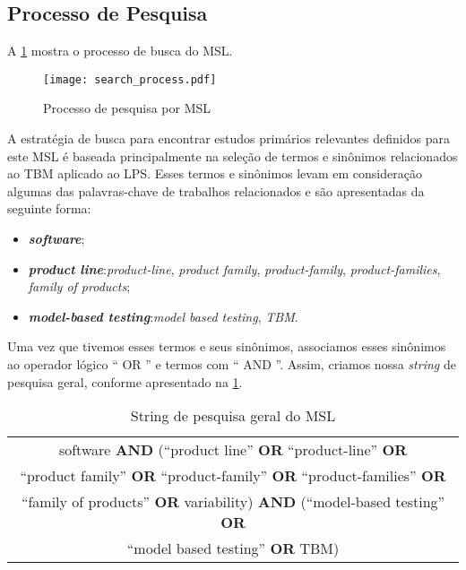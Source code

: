 \subsection{Processo de Pesquisa}
\label{sec:search_process}

A \ref{fig:search_process} mostra o processo de busca do MSL.

\begin{figure} [!h]
	\centering
	\texttt{[image: search\_process.pdf]}
	\caption{Processo de pesquisa por MSL}
	\label{fig:search_process}
\end{figure}

A estratégia de busca para encontrar estudos primários relevantes definidos para este MSL é baseada principalmente na seleção de termos e sinônimos relacionados ao TBM aplicado ao LPS. Esses termos e sinônimos levam em consideração algumas das palavras-chave de trabalhos relacionados e são apresentadas da seguinte forma:

\begin{itemize}
	\item \textbf{\textit{software}};
	\item \textbf{\textit{product line}}:\textit{product-line}, \textit{product family}, \textit{product-family}, \textit{product-families}, \textit{family of products};
	\item \textbf{\textit{model-based testing}}:\textit{model based testing}, \textit{TBM}.
\end{itemize}

Uma vez que tivemos esses termos e seus sinônimos, associamos esses sinônimos ao operador lógico `` OR '' e termos com `` AND ''. Assim, criamos nossa \textit{string} de pesquisa geral, conforme apresentado na \ref{tab:search_string}.

\begin{table}[!h]	
	\centering
	\caption{String de pesquisa geral do MSL}
	\label{tab:search_string}
	\begin{tabular}{@{}c@{}}	
		\hline			
		software \textbf{AND} (``product line'' \textbf{OR} ``product-line'' \textbf{OR} \\``product family'' \textbf{OR} ``product-family'' \textbf{OR} ``product-families'' \textbf{OR} \\``family of products'' \textbf{OR} variability) \textbf{AND} (``model-based testing'' \textbf{OR} \\``model based testing'' \textbf{OR} TBM)	
		\\\hline
	\end{tabular}
\end{table}

